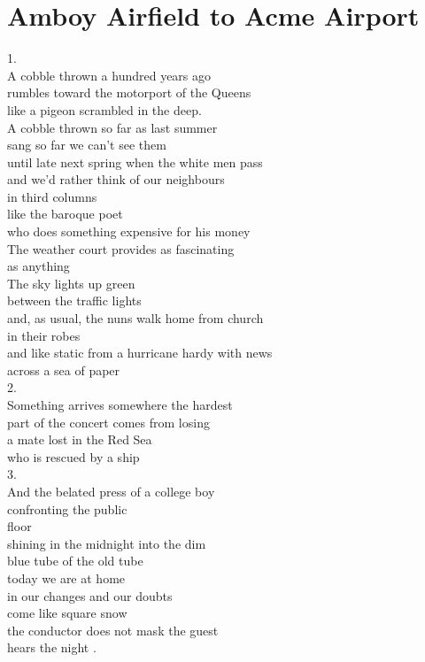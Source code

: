 \documentclass[smalldemyvopaper,11pt,twoside,onecolumn,openright,extrafontsizes]{memoir}
\begin{document}
\chapter{Amboy Airfield to Acme Airport}
1.
\\A cobble thrown a hundred years ago
\\rumbles toward the motorport of the Queens
\\like a pigeon scrambled in the deep.
\\A cobble thrown so far as last summer
\\sang so far we can't see them
\\until late next spring when the white men pass
\\and we'd rather think of our neighbours
\\in third columns
\\like the baroque poet
\\who does something expensive for his money
\\The weather court provides as fascinating
\\as anything
\\The sky lights up green
\\between the traffic lights
\\and, as usual, the nuns walk home from church
\\in their robes
\\and like static from a hurricane hardy with news
\\across a sea of paper
\\2.
\\Something arrives somewhere the hardest
\\part of the concert comes from losing
\\a mate lost in the Red Sea
\\who is rescued by a ship
\\3.
\\And the belated press of a college boy
\\confronting the public
\\floor
\\shining in the midnight into the dim
\\blue tube of the old tube
\\today we are at home
\\in our changes and our doubts
\\come like square snow
\\the conductor does not mask the guest
\\hears the night        .
\end{document}
